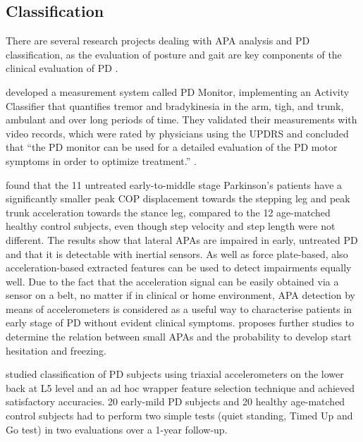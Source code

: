 \subsection{Classification}

There are several research projects dealing with APA analysis and PD classification, as the evaluation of posture and gait are key components of the clinical evaluation of PD \cite{palmerini_classification_2013}.

\citeauthor{klerk_long-term_2009} \cite{klerk_long-term_2009} developed a measurement system called PD Monitor, implementing an Activity Classifier that quantifies tremor and bradykinesia in the arm, tigh, and trunk, ambulant and over long periods of time. They validated their measurements with video records, which were rated by physicians using the UPDRS and concluded that ``the PD monitor can be used for a detailed evaluation of the PD motor symptoms in order to optimize treatment.'' \cite{klerk_long-term_2009}.

\citeauthor{mancini_anticipatory_2009} \cite{mancini_anticipatory_2009} found that the 11 untreated early-to-middle stage Parkinson's patients have a significantly smaller peak COP displacement towards the stepping leg and peak trunk acceleration towards the stance leg, compared to the 12 age-matched healthy control subjects, even though step velocity and step length were not different. The results show that lateral APAs are impaired in early, untreated PD and that it is detectable with inertial sensors. As well as force plate-based, also acceleration-based extracted features can be used to detect impairments equally well. Due to the fact that the acceleration signal can be easily obtained via a sensor on a belt, no matter if in clinical or home environment, APA detection by means of accelerometers is considered as a useful way to characterise patients in early stage of PD without evident clinical symptoms. \cite{mancini_anticipatory_2009} proposes further studies to determine the relation between small APAs and the probability to develop start hesitation and freezing.

\citeauthor{palmerini_classification_2013} \cite{palmerini_classification_2013} studied classification of PD subjects  using triaxial accelerometers on the lower back at L5 level and an ad hoc wrapper feature selection technique and achieved satisfactory accuracies. 20 early-mild PD subjects and 20 healthy age-matched control subjects had to perform two simple tests (quiet standing, Timed Up and Go test) in two evaluations over a 1-year follow-up.
